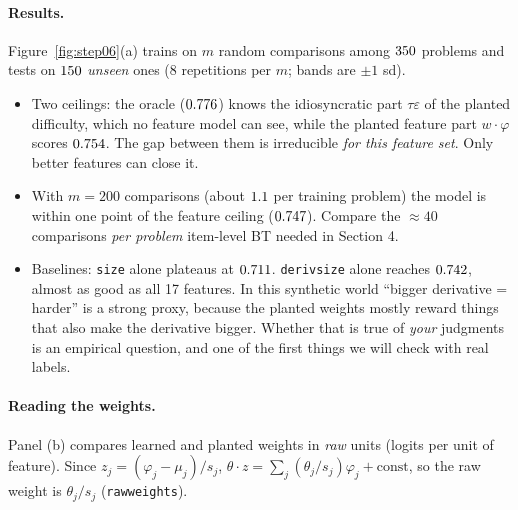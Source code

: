\documentclass[11pt]{article}
\theoremstyle{definition}
\theoremstyle{plain}
\theoremstyle{remark}
\newcommand{\code}[1]{\texttt{#1}}
\renewcommand{\_}{\oldunderscore\allowbreak}
\begin{document}
\paragraph{Results.}
Figure~\ref{fig:step06}(a) trains on $m$ random comparisons among $350$ problems and tests on $150$ \emph{unseen} ones
(8 repetitions per $m$; bands are $\pm1$ sd).
\begin{itemize}[nosep]
\item Two ceilings: the oracle ($0.776$) knows the idiosyncratic part $\tau\varepsilon$ of the planted difficulty, which no
  feature model can see, while the planted feature part $w\cdot\varphi$ scores $0.754$. The gap between them is irreducible
  \emph{for this feature set}. Only better features can close it.
\item With $m=200$ comparisons (about $1.1$ per training problem) the model is within one point of the feature
  ceiling ($0.747$). Compare the $\approx40$ comparisons \emph{per problem} item-level BT needed in Section 4.
\item Baselines: \code{size} alone plateaus at $0.711$. \code{deriv\_size} alone reaches $0.742$, almost as good as all
  17 features. In this synthetic world ``bigger derivative = harder'' is a strong proxy, because the planted weights mostly
  reward things that also make the derivative bigger. Whether that is true of \emph{your} judgments is an empirical question,
  and one of the first things we will check with real labels.
\end{itemize}

\paragraph{Reading the weights.}
Panel (b) compares learned and planted weights in \emph{raw} units (logits per unit of feature). Since $z_j=(\varphi_j-\mu_j)/s_j$,
$\theta\cdot z=\sum_j(\theta_j/s_j)\varphi_j+\text{const}$, so the raw weight is $\theta_j/s_j$ (\code{raw\_weights}).
\end{document}
